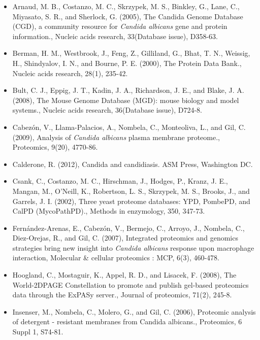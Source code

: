 \begin{itemize}[leftmargin=*]

\item[]{
Arnaud, M. B., Costanzo, M. C., Skrzypek, M. S., Binkley, G., Lane, C., Miyasato, S. R., and
Sherlock, G. (2005), The Candida Genome Database (CGD), a community resource for
\textit{Candida albicans} gene and protein information., Nucleic acids research, 33(Database issue), D358-63.
}

\item[]{
Berman, H. M., Westbrook, J., Feng, Z., Gilliland, G., Bhat, T. N., Weissig, H., Shindyalov, I. N.,
and Bourne, P. E. (2000), The Protein Data Bank., Nucleic acids research, 28(1), 235-42.
}

\item[]{
Bult, C. J., Eppig, J. T., Kadin, J. A., Richardson, J. E., and Blake, J. A. (2008), The Mouse
Genome Database (MGD): mouse biology and model systems., Nucleic acids research,
36(Database issue), D724-8.
}

\item[]{
Cabez\'on, V., Llama-Palacios, A., Nombela, C., Monteoliva, L., and Gil, C. (2009), Analysis of
\textit{Candida albicans} plasma membrane proteome., Proteomics, 9(20), 4770-86.
}

\item[]{
Calderone, R. (2012), Candida and candidiasis. ASM Press, Washington DC.
}

\item[]{
Csank, C., Costanzo, M. C., Hirschman, J., Hodges, P., Kranz, J. E., Mangan, M., O'Neill,
K., Robertson, L. S., Skrzypek, M. S., Brooks, J., and Garrels, J. I. (2002), Three yeast
proteome databases: YPD, PombePD, and CalPD (MycoPathPD)., Methods in enzymology,
350, 347-73.
}

\item[]{
Fern\'andez-Arenas, E., Cabez\'on, V., Bermejo, C., Arroyo, J., Nombela, C., Diez-Orejas, R.,
and Gil, C. (2007), Integrated proteomics and genomics strategies bring new insight into
\textit{Candida albicans} response upon macrophage interaction, Molecular \& cellular proteomics
: MCP, 6(3), 460-478.
}

\item[]{
Hoogland, C., Mostaguir, K., Appel, R. D., and Lisacek, F. (2008), The World-2DPAGE 
Constellation to promote and publish gel-based proteomics data through the ExPASy server.,
Journal of proteomics, 71(2), 245-8.
}

\item[]{
Insenser, M., Nombela, C., Molero, G., and Gil, C. (2006), Proteomic analysis of detergent -
resistant membranes from Candida albicans., Proteomics, 6 Suppl 1, S74-81.
}


\end{itemize}
